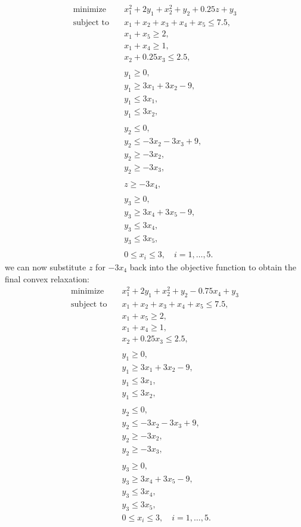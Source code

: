 \documentclass{article} %
\begin{document}
    \begin{align*}
    \text{minimize} \quad & x_1^2 + 2y_1 + x_2^2 + y_2 + 0.25z + y_3 \\
    \text{subject to} \quad & x_1 + x_2 + x_3 + x_4 + x_5 \leq 7.5, \\
    & x_1 + x_5 \geq 2, \\
    & x_1 + x_4 \geq 1, \\
    & x_2 + 0.25x_3 \leq 2.5, \\
    &\\
    & y_1 \geq 0, \\
    & y_1 \geq 3x_1 + 3x_2 - 9, \\
    & y_1 \leq 3x_1, \\
    & y_1 \leq 3x_2, \\
    &\\
    & y_2 \leq 0, \\
    & y_2 \leq -3x_2 - 3x_3 + 9, \\
    & y_2 \geq -3x_2, \\
    & y_2 \geq -3x_3, \\
    &\\
    & z \geq -3x_4, \\
    &\\
    & y_3 \geq 0, \\
    & y_3 \geq 3x_4 + 3x_5 - 9, \\
    & y_3 \leq 3x_4, \\
    & y_3 \leq 3x_5, \\
    &\\
    & 0 \leq x_i \leq 3, \quad i = 1, \ldots, 5.
    \end{align*}
    we can now substitute $z$ for $-3x_4$ back into the objective function to obtain the final convex relaxation:
    \begin{align*}
    \text{minimize} \quad & x_1^2 + 2y_1 + x_2^2 + y_2 -0.75x_4 + y_3 \\
    \text{subject to} \quad & x_1 + x_2 + x_3 + x_4 + x_5 \leq 7.5, \\
    & x_1 + x_5 \geq 2, \\
    & x_1 + x_4 \geq 1, \\
    & x_2 + 0.25x_3 \leq 2.5, \\
    &\\
    & y_1 \geq 0, \\
    & y_1 \geq 3x_1 + 3x_2 - 9, \\
    & y_1 \leq 3x_1, \\
    & y_1 \leq 3x_2, \\
    &\\
    & y_2 \leq 0, \\
    & y_2 \leq -3x_2 - 3x_3 + 9, \\
    & y_2 \geq -3x_2, \\
    & y_2 \geq -3x_3, \\
    &\\
    & y_3 \geq 0, \\
    & y_3 \geq 3x_4 + 3x_5 - 9, \\
    & y_3 \leq 3x_4, \\
    & y_3 \leq 3x_5, \\
    & 0 \leq x_i \leq 3, \quad i = 1, \ldots, 5.
    \end{align*}
\end{document}
